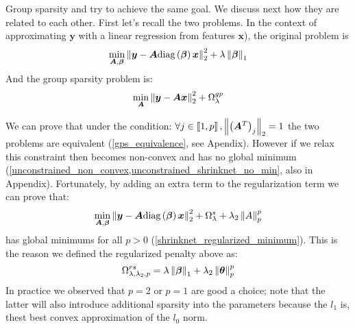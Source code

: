 Group sparsity and \shrink try to achieve the same goal. We discuss next how
they are related to each other. First let's recall the two problems. In the context of approximating $\bm{y}$ with a linear regression from features $\bm{x}$), the
original \shrink problem is 
%
\begin{equation}
  \min_{\bm{A}, \bm{\beta}} \left\lVert\bm{y} - \bm{A}\text{diag}\left(\bm{\beta}\right)\bm{x}\right\rVert_2^2 + \lambda \left\lVert\bm{\beta}\right\rVert_1
\end{equation}
%
And the group sparsity problem is:
%
\begin{equation}
  \min_{\bm{A}} \left\lVert\bm{y} - \bm{A}\bm{x}\right\rVert_2^2 + \Omega_\lambda^{gp}
\end{equation}
%

We can prove that under the condition: $\forall j\in \left\llbracket1, p\right\rrbracket,
\left\lVert\left(\bm{A}^T\right)_j\right\rVert_2 = 1$ the two problems are equivalent
(\cref{gps_equivalence}, see Apendix). However if we relax this constraint then \shrink
becomes non-convex and has no global minimum
(\cref{unconstrained_non_convex,unconstrained_shrinknet_no_min}, also in Appendix). Fortunately,
by adding an extra term to the \shrink regularization term we can prove that:
%
\begin{equation}
  \min_{\bm{A}, \bm{\beta}} \left\lVert\bm{y} - \bm{A}\text{diag}\left(\bm{\beta}\right)\bm{x}\right\rVert_2^2 + \Omega_\lambda^s + \lambda_2\left\lVert A\right\rVert_p^p
\end{equation}
%
has global minimums for all $p>0$ (\cref{shrinknet_regularized_minimum}).
This is the reason we defined the regularized \shrink penalty above as:
%
\begin{equation}
  \Omega_{\lambda, \lambda_2, p}^{rs} = \lambda\left\lVert\bm{\beta}\right\rVert_1 + \lambda_2\left\lVert\bm\theta\right\rVert_p^p
\end{equation}
%
In practice we observed that $p=2$ or $p=1$ are good a choice; note that the latter
will also introduce additional sparsity into the parameters because the $l_1$ is, 
thest best convex approximation of the $l_0$ norm.